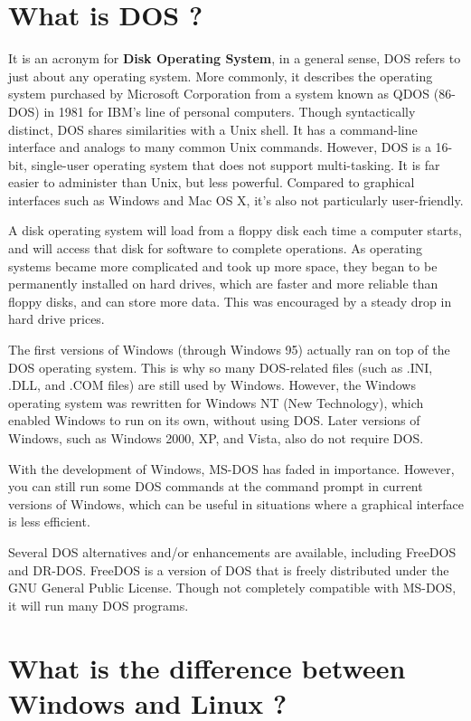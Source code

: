 \documentclass[10pt,a4paper,draft]{article}
\begin{document}
\section{What is DOS ?}

It is an acronym for \textbf{Disk Operating System}, in a general sense, DOS refers to just about any operating system. More commonly, it describes the operating system purchased by Microsoft Corporation from a system known as QDOS (86-DOS) in 1981 for IBM's line of personal computers. Though syntactically distinct, DOS shares similarities with a Unix shell. It has a command-line interface and analogs to many common Unix commands. However, DOS is a 16-bit, single-user operating system that does not support multi-tasking. It is far easier to administer than Unix, but less powerful. Compared to graphical interfaces such as Windows and Mac OS X, it's also not particularly user-friendly.

A disk operating system will load from a floppy disk each time a computer starts, and will access that disk for software to complete operations. As operating systems became more complicated and took up more space, they began to be permanently installed on hard drives, which are faster and more reliable than floppy disks, and can store more data. This was encouraged by a steady drop in hard drive prices.

The first versions of Windows (through Windows 95) actually ran on top of the DOS operating system. This is why so many DOS-related files (such as .INI, .DLL, and .COM files) are still used by Windows. However, the Windows operating system was rewritten for Windows NT (New Technology), which enabled Windows to run on its own, without using DOS. Later versions of Windows, such as Windows 2000, XP, and Vista, also do not require DOS.

With the development of Windows, MS-DOS has faded in importance. However, you can still run some DOS commands at the command prompt in current versions of Windows, which can be useful in situations where a graphical interface is less efficient.

Several DOS alternatives and/or enhancements are available, including FreeDOS and DR-DOS. FreeDOS is a version of DOS that is freely distributed under the GNU General Public License. Though not completely compatible with MS-DOS, it will run many DOS programs.

\section{What is the difference between Windows and Linux ?}
\end{document}
